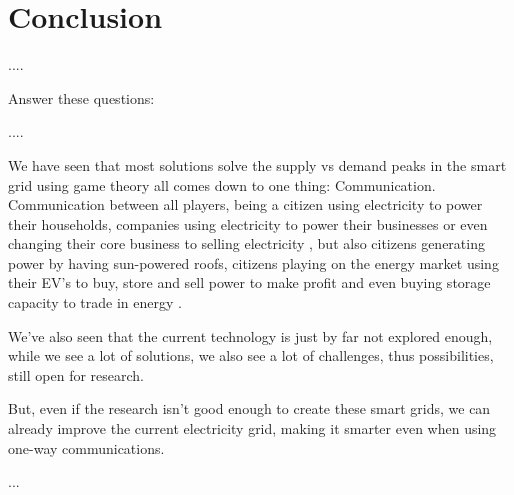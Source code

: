\section{Conclusion}

....

Answer these questions: 


....


We have seen that most solutions solve the supply vs demand peaks in the smart grid using game theory all comes down to one thing: Communication. Communication between all players, being a citizen using electricity to power their households, companies using electricity to power their businesses or even changing their core business to selling electricity \cite{Binczewski2002,Kumagai2012}, but also citizens generating power by having sun-powered roofs, citizens playing on the energy market using their EV's to buy, store and sell power to make profit and even buying storage capacity to trade in energy .

We've also seen that the current technology is just by far not explored enough, while we see a lot of solutions, we also see a lot of challenges, thus possibilities, still open for research. 

But, even if the research  isn't good enough to create these smart grids, we can already improve the current electricity grid, making it smarter even when using one-way communications. \cite{AgarwalCui2012}

...

